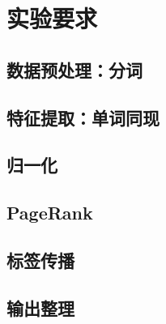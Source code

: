 \section{实验要求}
\subsection{数据预处理：分词}
\subsection{特征提取：单词同现}
\subsection{归一化}
\subsection{PageRank}
\subsection{标签传播}
\subsection{输出整理}
